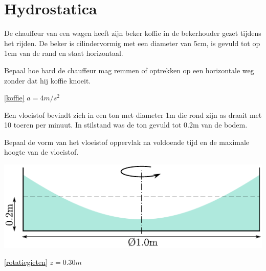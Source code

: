 \chapter{Hydrostatica}
\label{sec:Hydrostatica}
	\begin{toepassing}
		\label{koffie}
De chauffeur van een wagen heeft zijn beker koffie in de bekerhouder gezet tijdens het rijden. De beker is cilindervormig met een diameter van 5cm, is gevuld tot op 1cm van de rand en staat horizontaal.
		
Bepaal hoe hard de chauffeur mag remmen of optrekken op een horizontale weg zonder dat hij koffie knoeit.
	\end{toepassing}
	\begin{antwoord}{\ref{koffie}}
		$a = 4\unit{m/s^2}$
	\end{antwoord}
	\begin{toepassing}
		\label{rotatiegieten}
Een vloeistof bevindt zich in een ton met diameter 1m die rond zijn as draait met 10 toeren per minuut. In stilstand was de ton gevuld tot 0.2m van de bodem. 
		
Bepaal de vorm van het vloeistof oppervlak na voldoende tijd en de maximale hoogte van de vloeistof.

\centering
\includegraphics{fig/hydrostatica/rotatiegieten}
	\end{toepassing}
	\begin{antwoord}{\ref{rotatiegieten}}
		$z = 0.30\unit{m}$ 
	\end{antwoord}
